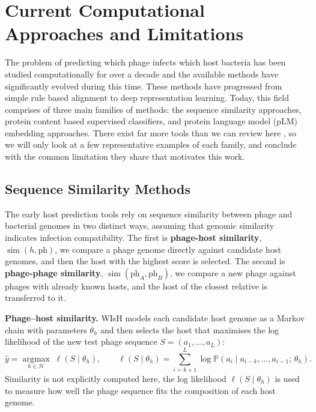 \newpage
\section{Current Computational Approaches and Limitations}
\label{sec2.2: current approaches}
The problem of predicting which phage infects which host bacteria has been studied computationally for over a 
decade and the available methods have significantly evolved during this time. These methods have progressed 
from simple rule based alignment to deep representation learning. Today, this field comprises of three main 
families of methods: the sequence similarity approaches, protein content based supervised classifiers, and protein 
language model (pLM) embedding approaches. There exist far more tools than we can review here \cite{coclet2021global}, 
so we will only look at a few representative examples of each family, and conclude with the common limitation they 
share that motivates this work.

 \subsection{Sequence Similarity Methods}
\label{sec2.2.1: classical methods}
The early host prediction tools rely on sequence similarity between phage and bacterial genomes in two distinct ways, 
assuming that genomic similarity indicates infection compatibility. The first is \textbf{phage-host similarity}, 
$\operatorname{sim}(h, \mathrm{ph})$, we compare a phage genome directly against candidate host genomes, and then the 
host with the highest score is selected. The second is \textbf{phage-phage similarity}, $\operatorname{sim}
(\mathrm{ph}_A, \mathrm{ph}_B)$, we compare a new phage against phages with already known hosts, and the host of the 
closest relative is transferred to it. 

\noindent\textbf{Phage--host similarity.} WIsH \cite{galiez2017wish} models each candidate host genome as 
a Markov chain with parameters $\theta_h$ and then selects the host that maximises the 
log likelihood of the new test phage sequence $S = (a_1, \ldots, a_L)$:
\begin{equation*}
\hat{y} = \operatorname*{argmax}_{h \in \mathcal{H}}\; \ell(S \mid \theta_h), \qquad \ell(S \mid \theta_h) = \sum_{i=k+1}
^{L} \log \mathbb{P}(a_i \mid a_{i-k}, \ldots, a_{i-1};\, \theta_h).
\end{equation*}
Similarity is not explicitly computed here, the log likelihood $\ell(S \mid \theta_h)$ is used to measure 
how well the phage sequence fits the composition of each host genome.

